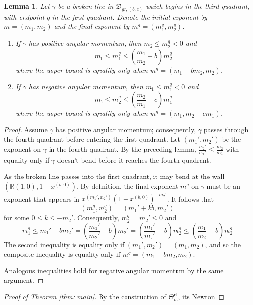 \documentclass[10pt]{amsart}
\newtheorem{lemma}{Lemma}[section]
\theoremstyle{remark}
\numberwithin{equation}{section}
\begin{document}
\begin{lemma}
Let $\gamma$ be a broken line in $\mathfrak{D}_{gr,(b,c)}$ which begins in the third quadrant, with endpoint $q$ in the first quadrant.  Denote the  initial exponent by $m=(m_1,m_2)$ and the final exponent by $m^q=(m_1^q,m_2^q)$.  
\begin{enumerate}
	\item If $\gamma$ has positive angular momentum, then $m_2\leq m_2^q<0$ and
	\[ m_1\leq m_1^q\leq\left( \frac{m_1}{m_2}-b\right)m_2^q\]
	where the upper bound is equality only when $m^q =( m_1-bm_2,m_2)$.
	\item If $\gamma$ has negative angular momentum, then $m_1\leq  m_1^q<0$ and
	\[ m_2 \leq m_2^q\leq\left( \frac{m_2}{m_1}-c\right)m_1^q\]
	where the upper bound is equality only when $m^q =( m_1,m_2-cm_1)$.
\end{enumerate}
\end{lemma}
\begin{proof}
Assume $\gamma$ has positive angular momentum; consequently, $\gamma$ passes through the fourth quadrant before entering the first quadrant.  Let $(m_1',m_2')$ be the exponent on $\gamma$ in the fourth quadrant.  By the preceding lemma, $\frac{m_2'}{m_1'}\leq \frac{m_2}{m_1}$ with equality only if $\gamma$ doesn't bend before it reaches the fourth quadrant.  

As the broken line passes into the first quadrant, it may bend at the wall $(\mathbb{R}(1,0),1+x^{(b,0)})$.  By definition, the final exponent $m^q$ on $\gamma$ must be an exponent that appears in $x^{(m_1',m_2')}(1+x^{(b,0)})^{-m_2'}$.  It follows that%
\[ (m_1^q,m_2^q) = (m_1'+kb,m_2')\]
for some $0\leq k\leq -m_2'$.
Consequently, $m_2^q=m_2'\leq0$ and 
\[ m_1^q\leq m_1' - bm_2' = \left(\frac{m_1'}{m_2'} - b\right) m_2'  = \left(\frac{m_1'}{m_2'} - b\right) m_2^q \leq \left(\frac{m_1}{m_2} - b\right) m_2^q\]
The second inequality is equality only if $(m_1',m_2')=(m_1,m_2)$, and so the composite inequality is equality only if $m^q =( m_1-bm_2,m_2)$.

Analogous inequalities hold for negative angular momentum by the same argument.
\end{proof}

\begin{proof}[Proof of Theorem \ref{thm: main}]
By the construction of $\Theta_m^\mathbf{d}$, its Newton 
\end{proof}
\end{document}
